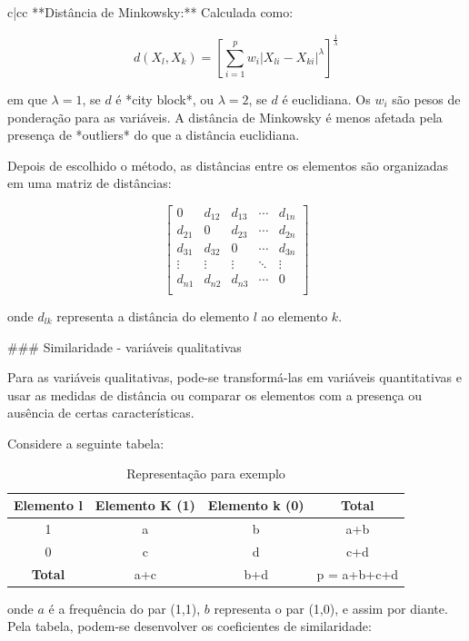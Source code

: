 \documentclass[
]{estat/estat}
\begin{document}
\begin{tabular}{c|cc}
**Distância de Minkowsky:** Calculada como:

$$
d(X_{l}, X_{k}) = \left[ \sum_{i=1}^{p} w_{i} |X_{li} - X_{ki}|^\lambda \right]^{\frac{1}{\lambda}}
$$

em que $\lambda = 1$, se $d$ é *city block*, ou $\lambda = 2$, se $d$ é euclidiana. Os $w_{i}$ são pesos de ponderação para as variáveis. A distância de Minkowsky é menos afetada pela presença de *outliers* do que a distância euclidiana.

Depois de escolhido o método, as distâncias entre os elementos são organizadas em uma matriz de distâncias:

$$
\begin{bmatrix}
        0 & d_{12} & d_{13} & \cdots & d_{1n} \\
        d_{21} & 0 & d_{23} & \cdots & d_{2n} \\
        d_{31} & d_{32} & 0 & \cdots & d_{3n} \\
    \vdots & \vdots & \vdots & \ddots & \vdots \\
        d_{n1} & d_{n2} & d_{n3} & \cdots & 0 \\
\end{bmatrix}
$$

onde $d_{lk}$ representa a distância do elemento $l$ ao elemento $k$.

### Similaridade - variáveis qualitativas

Para as variáveis qualitativas, pode-se transformá-las em variáveis quantitativas e usar as medidas de distância ou comparar os elementos com a presença ou ausência de certas características.

Considere a seguinte tabela:

\begin{table}[H]
\centering
\caption{Representação para exemplo}
\begin{tabular}{c | c c c}
\toprule
\textbf{Elemento l} & \textbf{Elemento K (1)} & \textbf{Elemento k (0)} & \textbf{Total} \\
\midrule
1      & a & b & a+b \\
0       & c & d & c+d \\
\midrule
\textbf{Total} & a+c & b+d & p = a+b+c+d \\ 
\bottomrule
\end{tabular}

\end{table}

onde \(a\) é a frequência do par (1,1), \(b\) representa o par (1,0), e
assim por diante. Pela tabela, podem-se desenvolver os coeficientes de
similaridade:


\end{tabular}
\end{document}
